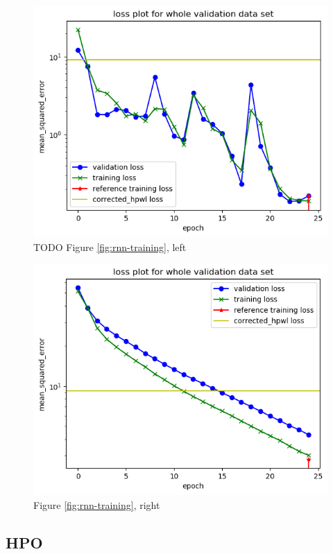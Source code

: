\begin{figure}[H]
\includegraphics[width=\linewidth]{plots/rnn-training-history-3_lstm_layers_2_dense_layers_inflating.png}
\caption{TODO Figure \ref{fig:rnn-training}, left}
\end{figure}

\begin{figure}[H]
\includegraphics[width=\linewidth]{plots/rnn-training-history-1_lstm_layers_1_dense_layers_inflating.png}
\caption{Figure \ref{fig:rnn-training}, right}
\end{figure}

\subsection{\gls{HPO}}

